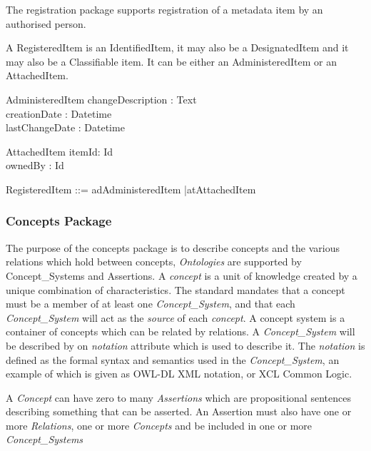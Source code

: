 \documentclass{llncs}
\begin{document}
The registration package supports registration of a metadata item by an authorised person. 

A RegisteredItem is an IdentifiedItem, it may also be a DesignatedItem and it may also be a Classifiable item. It can be either an AdministeredItem or an AttachedItem.


\begin{zed}
[LanguageTag]
\end{zed}
\begin{schema}{AdministeredItem}
changeDescription : Text \\
creationDate : Datetime \\
lastChangeDate : Datetime\\

\end{schema}

\begin{schema}{AttachedItem}
itemId: Id \\
ownedBy : Id
\end{schema}
 
\begin{zed}
RegisteredItem ::=  ad\ldata AdministeredItem \rdata |at\ldata AttachedItem \rdata
\end{zed}


\subsubsection{Concepts Package}
The purpose of the concepts package is to describe concepts and the various relations which hold between concepts, \emph{Ontologies} are supported by Concept\_Systems and Assertions. A \emph{concept} is a unit of knowledge created by a unique combination of characteristics. The standard mandates that a concept must be a member of at least one \emph{Concept\_System}, and that each \emph{Concept\_System} will act as the \emph{source} of each \emph{concept}. A concept system is a container of concepts which can be related by relations. A \emph{Concept\_System} will be described by on \emph{notation} attribute which is used to describe it. The \emph{notation} is defined as the formal syntax and semantics used in the  \emph{Concept\_System}, an example of which is given as OWL-DL XML notation, or XCL Common Logic.

A \emph{Concept} can have zero to many \emph{Assertions} which are propositional sentences describing something that can be asserted. An Assertion must also have one or more \emph{Relations}, one or more \emph{Concepts} and be included in one or more \emph{Concept\_Systems}
\end{document}
